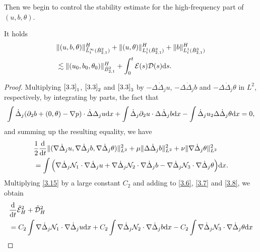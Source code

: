 \documentclass[reqno]{amsart}
\begin{document}
Then we begin to control the stability estimate for the high-frequency part of
$(u,b,\theta)$.

\begin{lemma}\label{lem3.2}
It holds
 \begin{equation}\label{3.14}
\begin{aligned}
&\|(u,b,\theta)\|_{\tilde{L}^\infty_t(\dot{B}^2_{2,1})}^H
 +\|(u,\theta)\|_{{L}^1_t(\dot{B}^2_{2,1})}^H+\|b\|_{{L}^1_t(\dot{B}^3_{2,1})}^H \\
&\lesssim\|(u_0,b_0,\theta_0)\|_{\dot{B}^2_{2,1}}^H
 +\int_0^t\mathcal{E}(s)\mathcal{D}(s){\rm d}s.
\end{aligned}
\end{equation}
\end{lemma}

\begin{proof}
Multiplying $\eqref{3.3}_1$, $\eqref{3.3}_2$ and $\eqref{3.3}_3$ by
$ -\Delta\dot{\Delta}_j u$, $ -\Delta\dot{\Delta}_j b$ and
$ -\Delta\dot{\Delta}_j \theta$ in $L^2$, respectively, by integrating by parts, the fact that
\[
 \int\dot{\Delta}_j(\partial_2b+(0,\theta)-\nabla p)\cdot\dot\Delta{\Delta}_j u{\rm d}x
 +\int\dot{\Delta}_j\partial_2u\cdot\Delta\dot{\Delta}_j b{\rm d}x
 -\int\dot{\Delta}_ju_2\Delta\dot{\Delta}_j\theta{\rm d}x=0,
\]
and summing up the resulting equality, we have
\begin{equation}\label{3.15}
\begin{aligned}
 &\frac{1}{2}\frac{\rm d}{{\rm d}t}\|(\nabla\dot{\Delta}_ju,\nabla\dot{\Delta}_jb,\nabla\dot{\Delta}_j\theta)\|_{L^2}^2+\mu\|\Delta\dot{\Delta}_jb\|_{L^2}^2+\nu\|\nabla\dot{\Delta}_j\theta\|_{L^2}^2 \\
 &=\int\Big(\nabla\dot{\Delta}_j \mathcal{N}_1\cdot\nabla \dot{\Delta}_ju+\nabla
  \dot{\Delta}_j \mathcal{N}_2\cdot \nabla\dot{\Delta}_jb-\nabla\dot{\Delta}_j
  \mathcal{N}_3\cdot \nabla\dot{\Delta}_j\theta\Big){\rm d}x.
\end{aligned}
\end{equation}
Multiplying \eqref{3.15} by a large constant $C_2$ and adding to \eqref{3.6}, \eqref{3.7}
and \eqref{3.8}, we obtain
 \begin{equation}\label{3.16}
\begin{aligned}
&\frac{\rm d}{{\rm d}t}\tilde{\mathcal{E}}_H^2+\tilde{\mathcal{D}}_H^2\\
&= C_2\int\nabla\dot{\Delta}_j \mathcal{N}_1\cdot \nabla\dot{\Delta}_ju{\rm d}x
 +C_2\int\nabla\dot{\Delta}_j \mathcal{N}_2\cdot\nabla \dot{\Delta}_jb{\rm d}x
 -C_2\int\nabla\dot{\Delta}_j \mathcal{N}_3\cdot \nabla\dot{\Delta}_j\theta{\rm d}x \\

\end{aligned}
\end{equation}
\end{proof}
\end{document}
